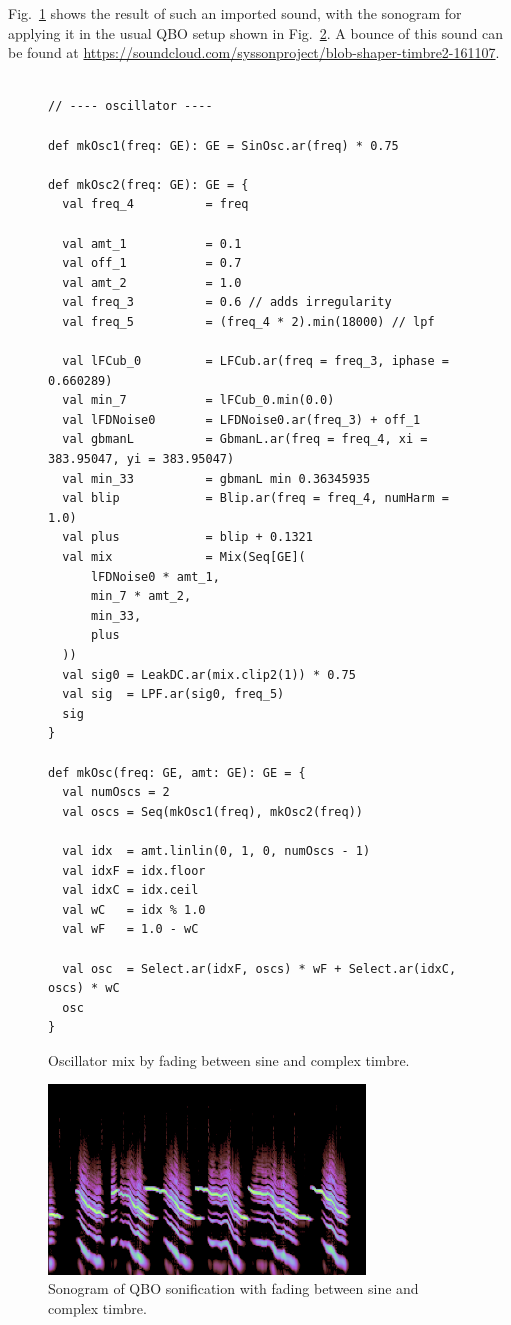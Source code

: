 \documentclass[11pt,a4paper]{article}
\newcommand{\figref}[1]{Fig.~\ref{#1}}
\begin{document}
\figref{fig:code-shaper-timbre2} shows the result of such an imported sound, with the sonogram for applying it in the usual QBO setup shown in \figref{fig:sono-shaper-timbre2}. A bounce of this sound can be found at \url{https://soundcloud.com/syssonproject/blob-shaper-timbre2-161107}.

\begin{figure}[b]
\begin{lstlisting}[style=scala]

// ---- oscillator ----

def mkOsc1(freq: GE): GE = SinOsc.ar(freq) * 0.75

def mkOsc2(freq: GE): GE = {
  val freq_4          = freq
  
  val amt_1           = 0.1
  val off_1           = 0.7
  val amt_2           = 1.0
  val freq_3          = 0.6 // adds irregularity
  val freq_5          = (freq_4 * 2).min(18000) // lpf
  
  val lFCub_0         = LFCub.ar(freq = freq_3, iphase = 0.660289)
  val min_7           = lFCub_0.min(0.0)
  val lFDNoise0       = LFDNoise0.ar(freq_3) + off_1
  val gbmanL          = GbmanL.ar(freq = freq_4, xi = 383.95047, yi = 383.95047)
  val min_33          = gbmanL min 0.36345935
  val blip            = Blip.ar(freq = freq_4, numHarm = 1.0)
  val plus            = blip + 0.1321
  val mix             = Mix(Seq[GE](
      lFDNoise0 * amt_1, 
      min_7 * amt_2, 
      min_33, 
      plus
  ))
  val sig0 = LeakDC.ar(mix.clip2(1)) * 0.75
  val sig  = LPF.ar(sig0, freq_5)
  sig
}

def mkOsc(freq: GE, amt: GE): GE = {
  val numOscs = 2
  val oscs = Seq(mkOsc1(freq), mkOsc2(freq))
  
  val idx  = amt.linlin(0, 1, 0, numOscs - 1)
  val idxF = idx.floor
  val idxC = idx.ceil
  val wC   = idx % 1.0
  val wF   = 1.0 - wC
  
  val osc  = Select.ar(idxF, oscs) * wF + Select.ar(idxC, oscs) * wC
  osc
}
\end{lstlisting}
\caption{Oscillator mix by fading between sine and complex timbre.}
\label{fig:code-shaper-timbre2}
\end{figure}

\begin{figure}
\centering
\includegraphics[width=0.75\textwidth]{figures/blob-shaper-timbre2-161106.png}
\caption{Sonogram of QBO sonification with fading between sine and complex timbre.}
\label{fig:sono-shaper-timbre2}
\end{figure}
\end{document}

